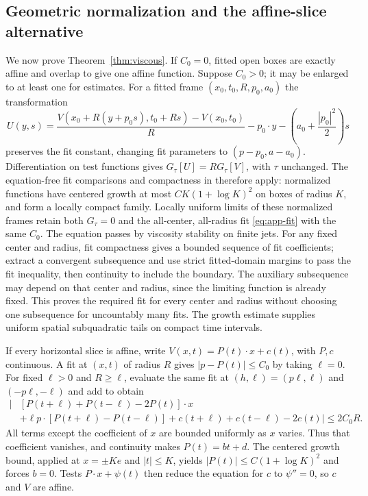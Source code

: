 \subsection{Geometric normalization and the affine-slice alternative}

We now prove Theorem~\ref{thm:viscous}. If $C_0=0$, fitted open boxes
are exactly affine and overlap to give one affine function. Suppose
$C_0>0$; it may be enlarged to at least one for estimates.
For a fitted frame $(x_0,t_0,R,p_0,a_0)$ the transformation
\begin{equation}\label{eq:app-frame}
 U(y,s)=\frac{V(x_0+R(y+p_0s),t_0+Rs)-V(x_0,t_0)}R
        -p_0\cdot y-\left(a_0+\frac{|p_0|^2}{2}\right)s
\end{equation}
preserves the fit constant, changing fit parameters to
$(p-p_0,a-a_0)$. Differentiation on test functions gives
$G_\tau[U]=R G_\tau[V]$, with $\tau$ unchanged. The equation-free
fit comparisons and compactness in \cite[Section 4]{OpenAI} therefore
apply: normalized functions have centered growth at most
$CK(1+\log K)^2$ on boxes of radius $K$, and form a locally compact
family. Locally uniform limits of these normalized frames retain
both $G_\tau=0$ and the all-center, all-radius fit
\eqref{eq:app-fit} with the same $C_0$. The equation passes by
viscosity stability on finite jets. For any fixed center and radius,
fit compactness gives a bounded sequence of fit coefficients;
extract a convergent subsequence and use strict fitted-domain margins
to pass the fit inequality, then continuity to include the boundary.
The auxiliary subsequence may depend on that center and radius,
since the limiting function is already fixed. This proves the
required fit for every center and radius without choosing one
subsequence for uncountably many fits.
The growth estimate supplies uniform spatial subquadratic tails on
compact time intervals.

If every horizontal slice is affine, write
$V(x,t)=P(t)\cdot x+c(t)$, with $P,c$ continuous. A fit at $(x,t)$
of radius $R$ gives $|p-P(t)|\leq C_0$ by taking $\ell=0$. For fixed
$\ell>0$ and $R\geq\ell$, evaluate the same fit at
$(h,\ell)=(p\ell,\ell)$ and $(-p\ell,-\ell)$ and add to obtain
\[
 \begin{split}
 \big|&[P(t+\ell)+P(t-\ell)-2P(t)]\cdot x\\
 &+\ell p\cdot[P(t+\ell)-P(t-\ell)]
      +c(t+\ell)+c(t-\ell)-2c(t)\big|\leq2C_0R.
 \end{split}
\]
All terms except the coefficient of $x$ are bounded uniformly as $x$
varies. Thus that coefficient vanishes, and continuity makes
$P(t)=bt+d$. The centered growth bound, applied at $x=\pm Ke$ and
$|t|\leq K$, yields $|P(t)|\leq C(1+\log K)^2$ and forces $b=0$.
Tests $P\cdot x+\psi(t)$ then reduce the equation for $c$ to
$\psi''=0$, so $c$ and $V$ are affine.

